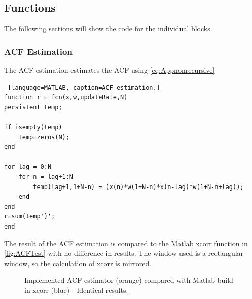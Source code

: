 \subsection{Functions}
The following sections will show the code for the individual blocks. 



\subsubsection{ACF Estimation}
The ACF estimation estimates the ACF using \autoref{eq:Appnonrecursive}
\begin{lstlisting} [language=MATLAB, caption=ACF estimation.]
function r = fcn(x,w,updateRate,N)
persistent temp;

if isempty(temp)
	temp=zeros(N);
end

for lag = 0:N
	for n = lag+1:N
		temp(lag+1,1+N-n) = (x(n)*w(1+N-n)*x(n-lag)*w(1+N-n+lag));
	end
end
r=sum(temp')';
end
\end{lstlisting}

The result of the ACF estimation is compared to the Matlab xcorr function in \autoref{fig:ACFTest} with no difference in results. The window used is a rectangular window, so the calculation of xcorr is mirrored.  
\begin{figure}[H]
	\centering
	
	\caption{Implemented ACF estimator (orange) compared with Matlab build in xcorr (blue) - Identical results.}
	\label{fig:ACFTest}
\end{figure}
 

